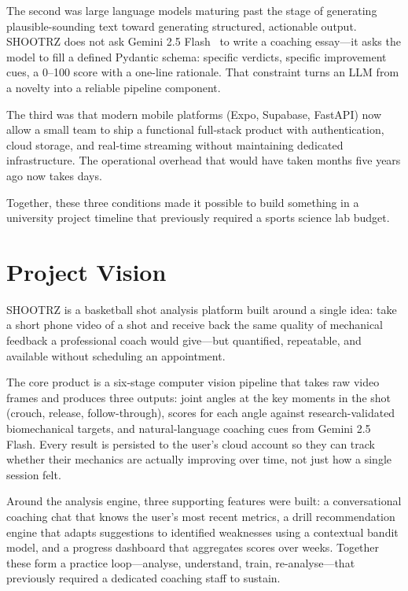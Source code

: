 The second was large language models maturing past the stage of generating plausible-sounding text toward generating structured, actionable output. SHOOTRZ does not ask Gemini 2.5 Flash~\cite{Gemini2024} to write a coaching essay---it asks the model to fill a defined Pydantic schema: specific verdicts, specific improvement cues, a 0--100 score with a one-line rationale. That constraint turns an LLM from a novelty into a reliable pipeline component.

The third was that modern mobile platforms (Expo, Supabase, FastAPI) now allow a small team to ship a functional full-stack product with authentication, cloud storage, and real-time streaming without maintaining dedicated infrastructure. The operational overhead that would have taken months five years ago now takes days.

Together, these three conditions made it possible to build something in a university project timeline that previously required a sports science lab budget.

\section{Project Vision}
\label{sec:vision}

SHOOTRZ is a basketball shot analysis platform built around a single idea: take a short phone video of a shot and receive back the same quality of mechanical feedback a professional coach would give---but quantified, repeatable, and available without scheduling an appointment.

The core product is a six-stage computer vision pipeline that takes raw video frames and produces three outputs: joint angles at the key moments in the shot (crouch, release, follow-through), scores for each angle against research-validated biomechanical targets, and natural-language coaching cues from Gemini 2.5 Flash. Every result is persisted to the user's cloud account so they can track whether their mechanics are actually improving over time, not just how a single session felt.

Around the analysis engine, three supporting features were built: a conversational coaching chat that knows the user's most recent metrics, a drill recommendation engine that adapts suggestions to identified weaknesses using a contextual bandit model, and a progress dashboard that aggregates scores over weeks. Together these form a practice loop---analyse, understand, train, re-analyse---that previously required a dedicated coaching staff to sustain.

